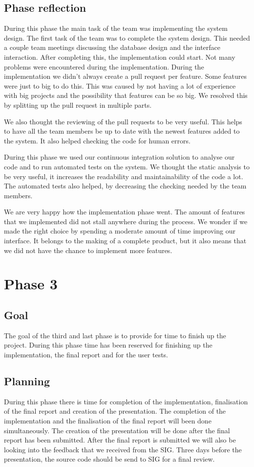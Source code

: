 \subsection{Phase reflection}
During this phase the main task of the team was implementing the system design.
The first task of the team was to complete the system design.
This needed a couple team meetings discussing the database design and the interface interaction.
After completing this, the implementation could start.
Not many problems were encountered during the implementation.
During the implementation we didn't always create a pull request per feature.
Some features were just to big to do this.
This was caused by not having a lot of experience with big projects and the possibility that features can be so big.
We resolved this by splitting up the pull request in multiple parts.

We also thought the reviewing of the pull requests to be very useful.
This helps to have all the team members be up to date with the newest features added to the system.
It also helped checking the code for human errors.

During this phase we used our continuous integration solution to analyse our code and to run automated tests on the system.
We thought the static analysis to be very useful, it increases the readability and maintainability of the code a lot.
The automated tests also helped, by decreasing the checking needed by the team members.

We are very happy how the implementation phase went.
The amount of features that we implemented did not stall anywhere during the process.
We wonder if we made the right choice by spending a moderate amount of time improving our interface.
It belongs to the making of a complete product, but it also means that we did not have the chance to implement more features.

\section{Phase 3}
\subsection{Goal}
The goal of the third and last phase is to provide for time to finish up the project.
During this phase time has been reserved for finishing up the implementation, the final report and for the user tests.

\subsection{Planning}
During this phase there is time for completion of the implementation, finalisation of the final report and creation of the presentation.
The completion of the implementation and the finalisation of the final report will been done simultaneously.
The creation of the presentation will be done after the final report has been submitted.
After the final report is submitted we will also be looking into the feedback that we received from the SIG.
Three days before the presentation, the source code should be send to SIG for a final review.

